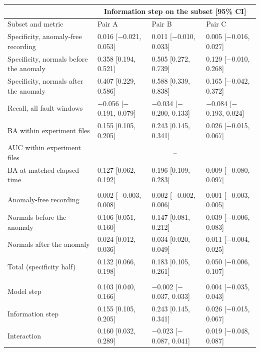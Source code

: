 \begin{tabular}{@{}>{\raggedright\arraybackslash}p{3.3cm} lll@{}}
\toprule
& \multicolumn{3}{c}{Information step on the subset [95\% CI]} \\
\cmidrule(l){2-4}
Subset and metric & Pair A & Pair B & Pair C \\
\midrule
Specificity, anomaly-free recording & 0.016 [$-$0.021, 0.053] & 0.011 [$-$0.010, 0.033] & 0.005 [$-$0.016, 0.027] \\
Specificity, normals before the anomaly & 0.358 [0.194, 0.521] & 0.505 [0.272, 0.739] & 0.129 [$-$0.010, 0.268] \\
Specificity, normals after the anomaly & 0.407 [0.229, 0.586] & 0.588 [0.339, 0.838] & 0.165 [$-$0.042, 0.372] \\
Recall, all fault windows & $-$0.056 [$-$0.191, 0.079] & $-$0.034 [$-$0.200, 0.133] & $-$0.084 [$-$0.193, 0.024] \\
BA within experiment files & 0.155 [0.105, 0.205] & 0.243 [0.145, 0.341] & 0.026 [$-$0.015, 0.067] \\
AUC within experiment files & \multicolumn{3}{c}{--} \\
BA at matched elapsed time & 0.127 [0.062, 0.192] & 0.196 [0.109, 0.283] & 0.009 [$-$0.080, 0.097] \\
\midrule
\multicolumn{4}{@{}l}{\textit{Specificity half of the information step, by subset}} \\
Anomaly-free recording & 0.002 [$-$0.003, 0.008] & 0.002 [$-$0.002, 0.006] & 0.001 [$-$0.003, 0.005] \\
Normals before the anomaly & 0.106 [0.051, 0.160] & 0.147 [0.081, 0.212] & 0.039 [$-$0.006, 0.083] \\
Normals after the anomaly & 0.024 [0.012, 0.036] & 0.034 [0.020, 0.049] & 0.011 [$-$0.004, 0.025] \\
Total (specificity half) & 0.132 [0.066, 0.198] & 0.183 [0.105, 0.261] & 0.050 [$-$0.006, 0.107] \\
\midrule
\multicolumn{4}{@{}l}{\textit{Decomposition restricted to experiment files}} \\
Model step & 0.103 [0.040, 0.166] & $-$0.002 [$-$0.037, 0.033] & 0.004 [$-$0.035, 0.043] \\
Information step & 0.155 [0.105, 0.205] & 0.243 [0.145, 0.341] & 0.026 [$-$0.015, 0.067] \\
Interaction & 0.160 [0.032, 0.289] & $-$0.023 [$-$0.087, 0.041] & 0.019 [$-$0.048, 0.087] \\
\bottomrule
\end{tabular}
